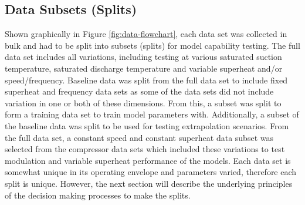 \documentclass[preprint,11pt,authoryear]{elsarticle}
\newcommand{\lcom}[2]{\todo[inline, caption={#1}]{#2}} %
\begin{document}
\subsection{Data Subsets (Splits)}

Shown graphically in Figure \ref{fig:data-flowchart}, each data set was collected in bulk and had to be split into subsets (splits) for model capability testing. The full data set includes all variations, including testing at various saturated suction temperature, saturated discharge temperature and variable superheat and/or speed/frequency. Baseline data was split from the full data set to include fixed superheat and frequency data sets as some of the data sets did not include variation in one or both of these dimensions. From this, a subset was split to form a training data set to train model parameters with. Additionally, a subset of the baseline data was split to be used for testing extrapolation scenarios. From the full data set, a constant speed and constant superheat data subset was selected from the compressor data sets which included these variations to test modulation and variable superheat performance of the models. Each data set is somewhat unique in its operating envelope and parameters varied, therefore each split is unique.  However, the next section will describe the underlying principles of the decision making processes to make the splits. %
\end{document}
